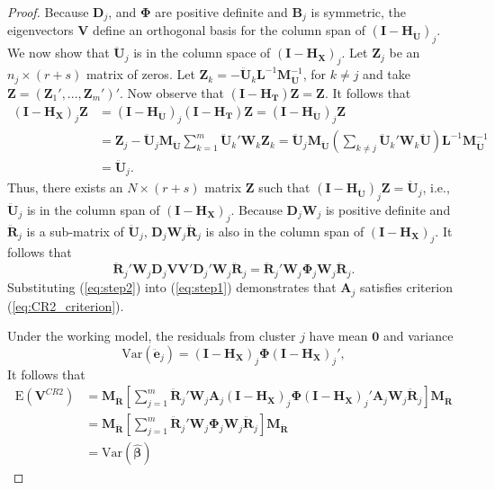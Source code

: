 \documentclass[12pt]{article}\usepackage[]{graphicx}\usepackage[]{color}
\newcommand{\E}{\text{E}}
\newcommand{\Var}{\text{Var}}
\newcommand{\bm}{\mathbf}
\newcommand{\bs}{\boldsymbol}
\begin{document}
\begin{proof}
Because $\bm{D}_j$, and $\bs\Phi$ are positive definite and $\bm{B}_j$ is symmetric, the eigenvectors $\bm{V}$ define an orthogonal basis for the column span of $\left(\bm{I} - \bm{H_{\ddot{U}}}\right)_j$. 
We now show that $\bm{\ddot{U}}_j$ is in the column space of $\left(\bm{I} - \bm{H_X}\right)_j$. 
Let $\bm{Z}_j$ be an $n_j \times (r + s)$ matrix of zeros. 
Let $\bm{Z}_k = - \bm{\ddot{U}}_k \bm{L}^{-1}\bm{M}_{\bm{\ddot{U}}}^{-1}$, for $k \neq j$ and take $\bm{Z} = \left(\bm{Z}_1',...,\bm{Z}_m'\right)'$. 
Now observe that $\left(\bm{I} - \bm{H_T}\right) \bm{Z} = \bm{Z}$. 
It follows that 
\begin{align*}
\left(\bm{I} - \bm{H_X}\right)_j \bm{Z} &= \left(\bm{I} - \bm{H_{\ddot{U}}}\right)_j \left(\bm{I} - \bm{H_T}\right) \bm{Z} = \left(\bm{I} - \bm{H_{\ddot{U}}}\right)_j \bm{Z} \\
&= \bm{Z}_j - \bm{\ddot{U}}_j\bm{M_{\ddot{U}}}\sum_{k=1}^m \bm{\ddot{U}}_k'\bm{W}_k\bm{Z}_k = \bm{\ddot{U}}_j\bm{M_{\ddot{U}}} \left(\sum_{k \neq j} \bm{\ddot{U}}_k' \bm{W}_k \bm{\ddot{U}} \right) \bm{L}^{-1}\bm{M}_{\bm{\ddot{U}}}^{-1} \\
&= \bm{\ddot{U}}_j.
\end{align*}
Thus, there exists an $N \times (r + s)$ matrix $\bm{Z}$ such that $\left(\bm{I} - \bm{H_{\ddot{U}}}\right)_j \bm{Z} = \bm{\ddot{U}}_j$, i.e., $\bm{\ddot{U}}_j$ is in the column span of $\left(\bm{I} - \bm{H_X}\right)_j$. Because $\bm{D}_j \bm{W}_j$ is positive definite and $\bm{\ddot{R}}_j$ is a sub-matrix of $\bm{\ddot{U}}_j$, $\bm{D}_j\bm{W}_j\bm{\ddot{R}}_j$ is also in the column span of $\left(\bm{I} - \bm{H_X}\right)_j$. It follows that 
\begin{equation}
\label{eq:step2}
\bm{\ddot{R}}_j' \bm{W}_j \bm{D}_j \bm{V}\bm{V}' \bm{D}_j' \bm{W}_j \bm{\ddot{R}}_j = \bm{\ddot{R}}_j' \bm{W}_j \bs\Phi_j \bm{W}_j \bm{\ddot{R}}_j.
\end{equation}
Substituting (\ref{eq:step2}) into (\ref{eq:step1}) demonstrates that $\bm{A}_j$ satisfies criterion (\ref{eq:CR2_criterion}).

Under the working model, the residuals from cluster $j$ have mean $\bm{0}$ and variance \[
\Var\left(\bm{\ddot{e}}_j\right) = \left(\bm{I} - \bm{H_X}\right)_j \bs\Phi \left(\bm{I} - \bm{H_X}\right)_j',\] 
It follows that 
\begin{align*}
\E\left(\bm{V}^{CR2}\right) &= \bm{M_{\ddot{R}}}\left[\sum_{j=1}^m \bm{\ddot{R}}_j' \bm{W}_j \bm{A}_j \left(\bm{I} - \bm{H_X}\right)_j \bs\Phi \left(\bm{I} - \bm{H_X}\right)_j' \bm{A}_j \bm{W}_j \bm{\ddot{R}}_j \right] \bm{M_{\ddot{R}}} \\
&= \bm{M_{\ddot{R}}}\left[\sum_{j=1}^m \bm{\ddot{R}}_j' \bm{W}_j \bs\Phi_j \bm{W}_j \bm{\ddot{R}}_j \right] \bm{M_{\ddot{R}}} \\
&= \Var\left(\bs{\hat\beta}\right)
\end{align*}
\end{proof}
\end{document}
